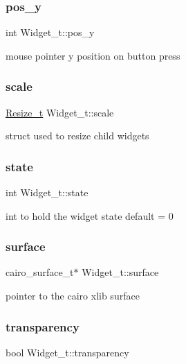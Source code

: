 \subsubsection{\texorpdfstring{pos\+\_\+y}{pos\_y}}
{\footnotesize\ttfamily int Widget\+\_\+t\+::pos\+\_\+y}

mouse pointer y position on button press \mbox{\label{structWidget__t_a9a2d5b53f40f5bf3914fc0694027d7ec}} 
\subsubsection{\texorpdfstring{scale}{scale}}
{\footnotesize\ttfamily \hyperlink{structResize__t}{Resize\+\_\+t} Widget\+\_\+t\+::scale}

struct used to resize child widgets \mbox{\label{structWidget__t_aaa935b64805fdeb78acb015c67d6638c}} 
\subsubsection{\texorpdfstring{state}{state}}
{\footnotesize\ttfamily int Widget\+\_\+t\+::state}

int to hold the widget state default = 0 \mbox{\label{structWidget__t_ae9b5979742ea31817ff7d7b34a56f88d}} 
\subsubsection{\texorpdfstring{surface}{surface}}
{\footnotesize\ttfamily cairo\+\_\+surface\+\_\+t$\ast$ Widget\+\_\+t\+::surface}

pointer to the cairo xlib surface \mbox{\label{structWidget__t_a42a597c21eca964c0296fc7026feb43b}} 
\subsubsection{\texorpdfstring{transparency}{transparency}}
{\footnotesize\ttfamily bool Widget\+\_\+t\+::transparency}

